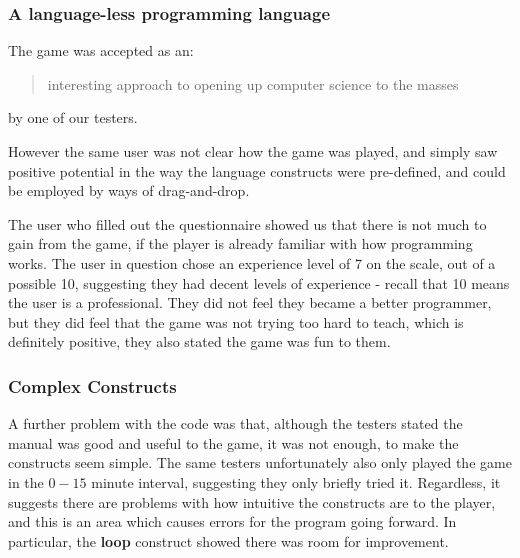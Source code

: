 \subsubsection{A language-less programming language}

The game was accepted as an: 

\begin{quotation}interesting approach to opening up computer science to the masses\end{quotation} by one of our testers.

However the same user was not clear how the game was played, and simply saw positive potential in the way the language constructs were pre-defined, and could be employed by ways of drag-and-drop. 


The user who filled out the questionnaire showed us that there is not much to gain from the game, if the player is already familiar with how programming works. The user in question chose an experience level of 7 on the scale, out of a possible 10, suggesting they had decent levels of experience - recall that 10 means the user is a professional. They did not feel they became a better programmer, but they did feel that the game was not trying too hard to teach, which is definitely positive, they also stated the game was fun to them.


\subsubsection{Complex Constructs}

A further problem with the code was that, although the testers stated the manual was good and useful to the game, it was not enough, to make the constructs seem simple. The same testers unfortunately also only played the game in the $0-15$ minute interval, suggesting they only briefly tried it. Regardless, it suggests there are problems with how intuitive the constructs are to the player, and this is an area which causes errors for the program going forward. In particular, the \textbf{loop} construct showed there was room for improvement.